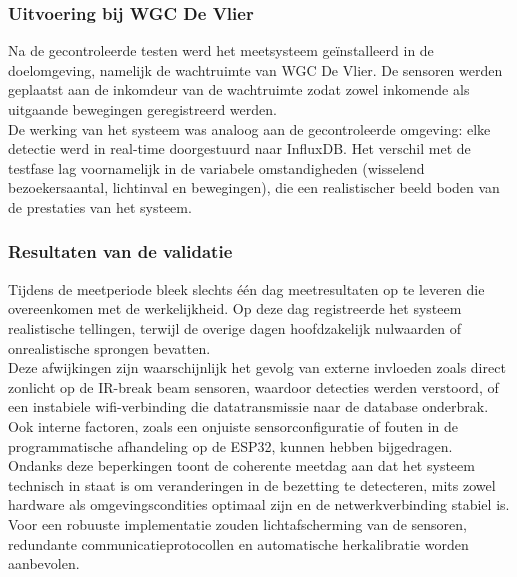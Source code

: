 \subsubsection{Uitvoering bij WGC De Vlier}
Na de gecontroleerde testen werd het meetsysteem geïnstalleerd in de doelomgeving, namelijk de wachtruimte van WGC De Vlier. De sensoren werden geplaatst aan de inkomdeur van de wachtruimte zodat zowel inkomende als uitgaande bewegingen geregistreerd werden. \\

De werking van het systeem was analoog aan de gecontroleerde omgeving: elke detectie werd in real-time doorgestuurd naar InfluxDB. Het verschil met de testfase lag voornamelijk in de variabele omstandigheden (wisselend bezoekersaantal, lichtinval en bewegingen), die een realistischer beeld boden van de prestaties van het systeem.


\subsubsection{Resultaten van de validatie}
Tijdens de meetperiode bleek slechts één dag meetresultaten op te leveren die overeenkomen met de werkelijkheid. Op deze dag registreerde het systeem realistische tellingen, terwijl de overige dagen hoofdzakelijk nulwaarden of onrealistische sprongen bevatten. \\

Deze afwijkingen zijn waarschijnlijk het gevolg van externe invloeden zoals direct zonlicht op de IR-break beam sensoren, waardoor detecties werden verstoord, of een instabiele wifi-verbinding die datatransmissie naar de database onderbrak. Ook interne factoren, zoals een onjuiste sensorconfiguratie of fouten in de programmatische afhandeling op de ESP32, kunnen hebben bijgedragen. \\

Ondanks deze beperkingen toont de coherente meetdag aan dat het systeem technisch in staat is om veranderingen in de bezetting te detecteren, mits zowel hardware als omgevingscondities optimaal zijn en de netwerkverbinding stabiel is. Voor een robuuste implementatie zouden lichtafscherming van de sensoren, redundante communicatieprotocollen en automatische herkalibratie worden aanbevolen.

